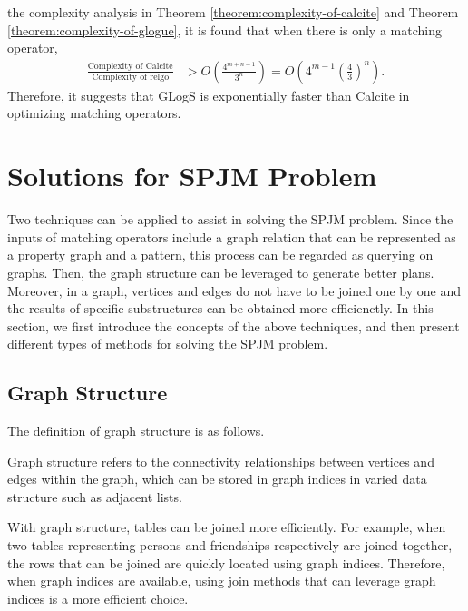 \iffalse
the complexity analysis in Theorem \ref{theorem:complexity-of-calcite} and Theorem \ref{theorem:complexity-of-glogue}, it is found that when there is only a matching operator,
\begin{equation*}
    \begin{split}
        \frac{\text{Complexity of Calcite}}{\text{Complexity of relgo}} & > O(\frac{4^{m+n-1}}{3^n}) = O(4^{m-1}(\frac{4}{3})^n).
    \end{split}
\end{equation*}
Therefore, it suggests that GLogS is exponentially faster than Calcite in optimizing matching operators.

\section{Solutions for SPJM Problem}
Two techniques can be applied to assist in solving the SPJM problem.
Since the inputs of matching operators include a graph relation that can be represented as a property graph and a pattern, this process can be regarded as querying on graphs.
Then, the graph structure can be leveraged to generate better plans.
Moreover, in a graph, vertices and edges do not have to be joined one by one and the results of specific substructures can be obtained more efficienctly.
In this section, we first introduce the concepts of the above techniques, and then present different types of methods for solving the SPJM problem.

\subsection{Graph Structure}

The definition of graph structure is as follows.

\begin{definition}
    Graph structure refers to the connectivity relationships between vertices and edges within the graph, which can be stored in graph indices in varied data structure such as adjacent lists.
\end{definition}

With graph structure, tables can be joined more efficiently.
For example, when two tables representing persons and friendships respectively are joined together, the rows that can be joined are quickly located using graph indices.
Therefore, when graph indices are available, using join methods that can leverage graph indices is a more efficient choice.

